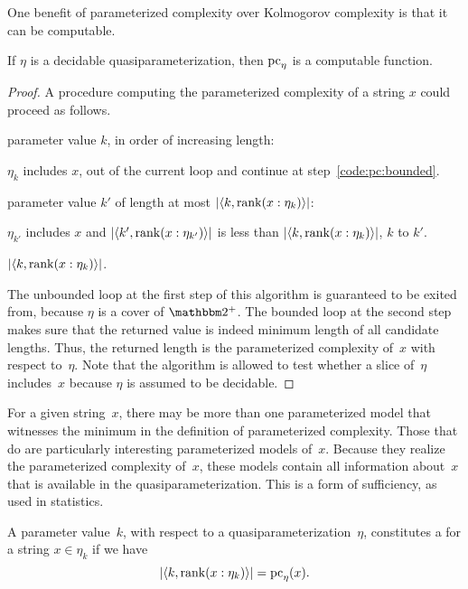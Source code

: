 One benefit of parameterized complexity over Kolmogorov complexity is that it can be computable.
\begin{lemma}
\label{lem:pccomputable}%
  If $\eta$ is a decidable quasiparameterization, then $\operatorname{pc}_\eta$ is a computable function.
\end{lemma}
\begin{proof}
  A procedure computing the parameterized complexity of a string $x$ could proceed as follows.
  \begin{codelisting}
  \item
     parameter value $k$, in order of increasing length:
    \begin{codelisting}
    \item
       $\eta_k$ includes $x$,
      \itemcont {} out of the current loop and continue at step~\ref{code:pc:bounded}.
    \end{codelisting}
  \item\label{code:pc:bounded}%
     parameter value $k'$ of length at most ${\lvert{\langle k, \operatorname{rank}(x : \eta_k)\rangle}\rvert}$:
    \begin{codelisting}
    \item
       $\eta_{k'}$ includes $x$ and $\length{\pair{k'}{\rank(x : \eta_{k'})}}$ is less than $\length{\pair{k}{\rank(x : \eta_k)}}$,
      \itemcont {} $k$ to $k'$.
    \end{codelisting}
    \item
       ${\lvert{\langle k, \operatorname{rank}(x : \eta_k)\rangle}\rvert}$.
  \end{codelisting}
  The unbounded loop at the first step of this algorithm is guaranteed to be exited from, because $\eta$ is a cover of $\binary^+$.
  The bounded loop at the second step makes sure that the returned value is indeed minimum length of all candidate lengths.
  Thus, the returned length is the parameterized complexity of~$x$ with respect to~$\eta$.
  Note that the algorithm is allowed to test whether a slice of~$\eta$ includes~$x$ because $\eta$ is assumed to be decidable.
\end{proof}

For a given string~$x$, there may be more than one parameterized model that witnesses the minimum in the definition of parameterized complexity.
Those that do are particularly interesting parameterized models of~$x$.
Because they realize the parameterized complexity of~$x$, these models contain all information about~$x$ that is available in the quasiparameterization.
This is a form of sufficiency, as used in statistics.
\begin{definition}
  A parameter value~$k$, with respect to a quasiparameterization~$\eta$, constitutes a  for a string $x \in \eta_k$ if we have
  \begin{equation*}
    {\lvert{\langle k, \operatorname{rank}(x : \eta_k)\rangle}\rvert} = \operatorname{pc}_\eta(x).
  \end{equation*}
\end{definition}

